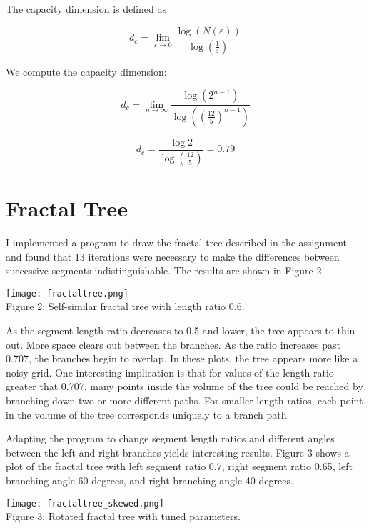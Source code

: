 \documentclass[12pt, letterpaper]{article}
\begin{document}
The capacity dimension is defined as 

\begin{equation}
d_c = \lim_{\varepsilon \to 0} \frac{\log(N(\varepsilon))}{\log(\frac{1}{\varepsilon})}
\end{equation}

We compute the capacity dimension:

\begin{equation}
d_c = \lim_{n \to \infty} \frac{\log(2^{n-1})}{\log((\frac{12}{5})^{n-1})}
\end{equation}

\begin{equation}
d_c = \frac{\log 2}{\log(\frac{12}{5})} = 0.79
\end{equation}

\section*{Fractal Tree}

I implemented a program to draw the fractal tree described in the assignment and
found that 13 iterations were necessary to make the differences between 
successive segments indistinguishable. The results are shown in Figure 2.

\begin{center}
\texttt{[image: fractaltree.png]}
\\
Figure 2: Self-similar fractal tree with length ratio 0.6.
\end{center}

As the segment length ratio decreases to 0.5 and lower, the tree appears to thin
out. More space clears out between the branches. As the ratio increases past 
0.707, the branches begin to overlap. In these plots, the tree appears more like
a noisy grid. One interesting implication is that for values of the length ratio
greater that 0.707, many points inside the volume of the tree could be reached
by branching down two or more different paths. For smaller length ratios, each 
point in the volume of the tree corresponds uniquely to a branch path.

Adapting the program to change segment length ratios and different angles
between the left and right branches yields interesting results. Figure 3 shows a
plot of the fractal tree with left segment ratio 0.7, right segment ratio 0.65, 
left branching angle 60 degrees, and right branching angle 40 degrees.

\begin{center}
\texttt{[image: fractaltree\_skewed.png]}
\\
Figure 3: Rotated fractal tree with tuned parameters.
\end{center}
\end{document}
